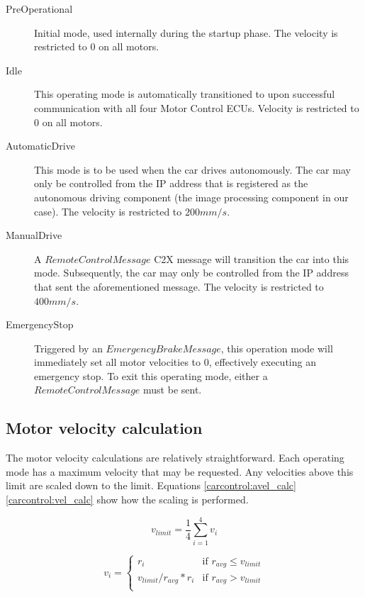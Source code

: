 \begin{description} 
\item[PreOperational] Initial mode, used internally during the startup phase. The velocity is restricted to $0$ on all motors.
\item[Idle] This operating mode is automatically transitioned to upon successful communication with all four Motor Control ECUs. Velocity is restricted to $0$ on all motors.
\item[AutomaticDrive] This mode is to be used when the car drives autonomously. The car may only be controlled from the IP address that is registered as the autonomous driving component (the image processing component in our case). The velocity is restricted to $200mm/s$.
\item[ManualDrive] A $RemoteControlMessage$ C2X message will transition the car into this mode. Subsequently, the car may only be controlled from the IP address that sent the aforementioned message. The velocity is restricted to $400mm/s$.
\item[EmergencyStop] Triggered by an $EmergencyBrakeMessage$, this operation mode will immediately set all motor velocities to $0$, effectively executing an emergency stop. To exit this operating mode, either a $RemoteControlMessage$ must be sent.
\end{description}

\subsection{Motor velocity calculation}
The motor velocity calculations are relatively straightforward. Each operating mode has a maximum velocity that may be requested. Any velocities above this limit are scaled down to the limit. Equations \eqref{carcontrol:avel_calc} \eqref{carcontrol:vel_calc} show how the scaling is performed.

\begin{equation}
\label{carcontrol:avel_calc}
v_{limit} = \frac{1}{4} \sum_{i=1}^{4} v_i 
\end{equation}

\begin{equation}
\label{carcontrol:vel_calc}
v_{i} = 
\begin{cases}
r_{i} & \mbox{if } r_{avg} \leq v_{limit} \\
v_{limit}/r_{avg} * r_{i} & \mbox{if } r_{avg} > v_{limit} \\
\end{cases}
\end{equation}


